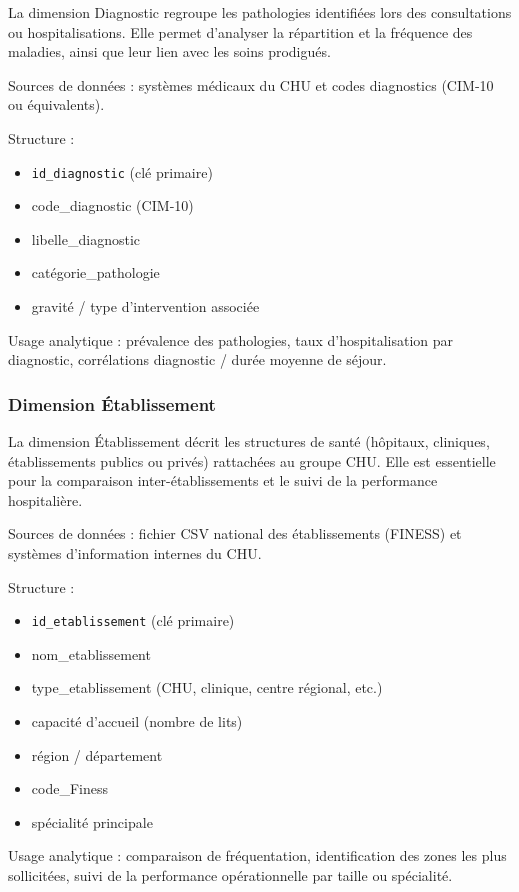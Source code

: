 \documentclass[12pt,a4paper]{article}
\begin{document}
La dimension Diagnostic regroupe les pathologies identifiées lors des consultations ou hospitalisations. Elle permet d’analyser la répartition et la fréquence des maladies, ainsi que leur lien avec les soins prodigués.

Sources de données : systèmes médicaux du CHU et codes diagnostics (CIM‑10 ou équivalents).

Structure :
\begin{itemize}
    \item \texttt{id\_diagnostic} (clé primaire)
    \item code\_diagnostic (CIM‑10)
    \item libelle\_diagnostic
    \item catégorie\_pathologie
    \item gravité / type d’intervention associée
\end{itemize}

Usage analytique : prévalence des pathologies, taux d’hospitalisation par diagnostic, corrélations diagnostic / durée moyenne de séjour.

\subsubsection{Dimension Établissement}

La dimension Établissement décrit les structures de santé (hôpitaux, cliniques, établissements publics ou privés) rattachées au groupe CHU. Elle est essentielle pour la comparaison inter-établissements et le suivi de la performance hospitalière.

Sources de données : fichier CSV national des établissements (FINESS) et systèmes d’information internes du CHU.

Structure :
\begin{itemize}
    \item \texttt{id\_etablissement} (clé primaire)
    \item nom\_etablissement
    \item type\_etablissement (CHU, clinique, centre régional, etc.)
    \item capacité d’accueil (nombre de lits)
    \item région / département
    \item code\_Finess
    \item spécialité principale
\end{itemize}

Usage analytique : comparaison de fréquentation, identification des zones les plus sollicitées, suivi de la performance opérationnelle par taille ou spécialité.
\end{document}
